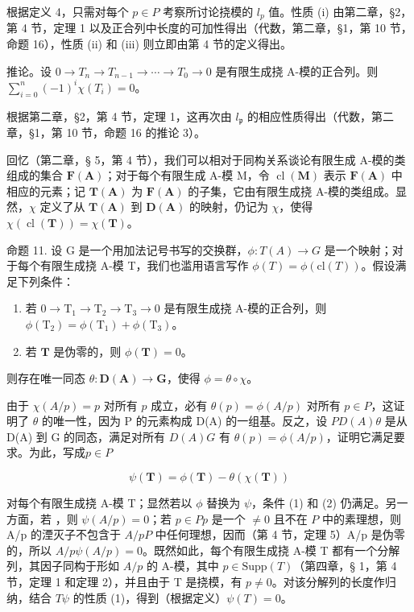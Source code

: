 根据定义 4，只需对每个 \(p \in P\) 考察所讨论挠模的 \(l_{p}\) 值。性质 (i) 由第二章，§2，第 4 节，定理 1 以及正合列中长度的可加性得出（代数，第二章，§1，第 10 节，命题 16），性质 (ii) 和 (iii) 则立即由第 4 节的定义得出。

推论。设 \(0 \to T_n \to T_{n-1} \to \cdots \to T_0 \to 0\) 是有限生成挠 A-模的正合列。则 \(\sum_{i=0}^{n} (-1)^i \chi(T_i) = 0\)。

根据第二章，§2，第 4 节，定理 1，这再次由 \(l_{\mathfrak{p}}\) 的相应性质得出（代数，第二章，§1，第 10 节，命题 16 的推论 3）。

回忆（第二章，§ 5，第 4 节），我们可以相对于同构关系谈论有限生成 A-模的类组成的集合 \(\mathbf{F}(\mathbf{A})\)；对于每个有限生成 A-模 M，令 \(\operatorname{cl}(\mathbf{M})\) 表示 \(\mathbf{F}(\mathbf{A})\) 中相应的元素；记 \(\mathbf{T}(\mathbf{A})\) 为 \(\mathbf{F}(\mathbf{A})\) 的子集，它由有限生成挠 A-模的类组成。显然，\(\chi\) 定义了从 \(\mathbf{T}(\mathbf{A})\) 到 \(\mathbf{D}(\mathbf{A})\) 的映射，仍记为 \(\chi\)，使得 \(\chi(\operatorname{cl}(\mathbf{T})) = \chi(\mathbf{T})\)。

命题 11. 设 G 是一个用加法记号书写的交换群，\(\phi: T(A) \to G\) 是一个映射；对于每个有限生成挠 A-模 T，我们也滥用语言写作 \(\phi(T) = \phi(\text{cl}(T))\)。假设满足下列条件：

\begin{enumerate}
\def\labelenumi{(\arabic{enumi})}
\item
  若 \(0 \to \mathrm{T}_1 \to \mathrm{T}_2 \to \mathrm{T}_3 \to 0\) 是有限生成挠 A-模的正合列，则 \(\phi(\mathrm{T}_2) = \phi(\mathrm{T}_1) + \phi(\mathrm{T}_3)\)。
\item
  若 \(\mathbf{T}\) 是伪零的，则 \(\phi (\mathbf{T}) = 0\)。
\end{enumerate}

则存在唯一同态 \(\theta: \mathbf{D}(\mathbf{A}) \to \mathbf{G}\)，使得 \(\phi = \theta \circ \chi\)。

由于 \(\chi(A/p) = p\) 对所有 \(p\) 成立，必有 \(\theta(p) = \phi(A/p)\) 对所有 \(p \in P\)，这证明了 \(\theta\) 的唯一性，因为 P 的元素构成 D(A) 的一组基。反之，设 \(P\)\(D(A)\)\(\theta\) 是从 D(A) 到 G 的同态，满足对所有 \(D(A)\)\(G\) 有 \(\theta(p) = \phi(A/p)\)，证明它满足要求。为此，写成\(p \in P\)

\[
\psi (\mathbf {T}) = \phi (\mathbf {T}) - \theta (\chi (\mathbf {T}))
\]

对每个有限生成挠 A-模 T；显然若以 \(\phi\) 替换为 \(\psi\)，条件 (1) 和 (2) 仍满足。另一方面，若 ，则 \(\psi(A/p) = 0\)；若 \(p \in P\)\(p\) 是一个 \(\neq 0\) 且不在 \(P\) 中的素理想，则 A/p 的湮灭子不包含于 \(A/p\)\(P\) 中任何理想，因而（第 4 节，定理 5）A/p 是伪零的，所以 \(A/p\)\(\psi(A/p) = 0\)。既然如此，每个有限生成挠 A-模 T 都有一个分解列，其因子同构于形如 \(A/p\) 的 A-模，其中 \(p \in \text{Supp}(T)\)（第四章，§ 1，第 4 节，定理 1 和定理 2），并且由于 T 是挠模，有 \(p \neq 0\)。对该分解列的长度作归纳，结合 \(T\)\(\psi\) 的性质 (1)，得到（根据定义）\(\psi(T) = 0\)。

